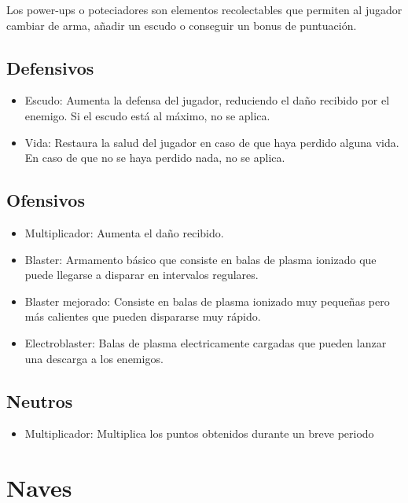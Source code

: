 \documentclass[12pt, spanish, a4paper]{article}
\begin{document}
	Los power-ups o poteciadores son elementos recolectables que permiten al jugador cambiar de arma, añadir un escudo o conseguir un bonus de puntuación.
	
	\subsection{Defensivos}
	
	\begin{itemize}
		\item Escudo: Aumenta la defensa del jugador, reduciendo el daño recibido por el enemigo. Si el escudo está al máximo, no se aplica.
		\item Vida: Restaura la salud del jugador en caso de que haya perdido alguna vida. En caso de que no se haya perdido nada, no se aplica.
	\end{itemize}
	
	\subsection{Ofensivos}
	
	\begin{itemize}
		\item Multiplicador: Aumenta el daño recibido.
		\item Blaster: Armamento básico que consiste en balas de plasma ionizado que puede llegarse a disparar en intervalos regulares.
		\item Blaster mejorado: Consiste en balas de plasma ionizado muy pequeñas pero más calientes que pueden dispararse muy rápido.
		\item Electroblaster: Balas de plasma electricamente cargadas que pueden lanzar una descarga a los enemigos.
	\end{itemize}
	
	\subsection{Neutros}
	
	\begin{itemize}
		\item Multiplicador: Multiplica los puntos obtenidos durante un breve periodo
	\end{itemize}
	
	\section{Naves}
	
\end{document}
